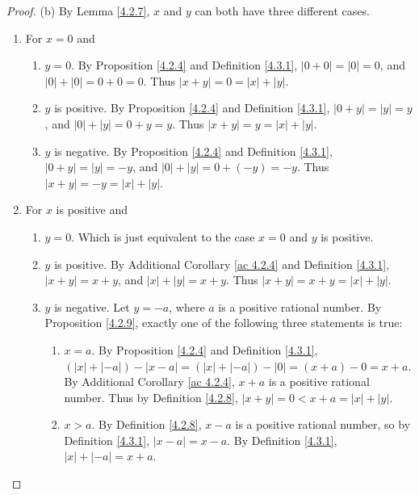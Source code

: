 \begin{proof}{(b)}
By Lemma \ref{4.2.7}, \(x\) and \(y\) can both have three different cases.
\begin{enumerate}[label=(\Roman*)]
    \item For \(x = 0\) and
    \begin{enumerate}[label=(\roman*)]
        \item \(y = 0\).
        By Proposition \ref{4.2.4} and Definition \ref{4.3.1}, \(|0 + 0| = |0| = 0\), and \(|0| + |0| = 0 + 0 = 0\).
        Thus \(|x + y| = 0 = |x| + |y|\).
        \item \(y\) is positive.
        By Proposition \ref{4.2.4} and Definition \ref{4.3.1}, \(|0 + y| = |y| = y\), and \(|0| + |y| = 0 + y = y\).
        Thus \(|x + y| = y = |x| + |y|\).
        \item \(y\) is negative.
        By Proposition \ref{4.2.4} and Definition \ref{4.3.1}, \(|0 + y| = |y| = -y\), and \(|0| + |y| = 0 + (-y) = -y\).
        Thus \(|x + y| = -y = |x| + |y|\).
    \end{enumerate}
    \item For \(x\) is positive and
    \begin{enumerate}[label=(\roman*)]
        \item \(y = 0\).
        Which is just equivalent to the case \(x = 0\) and \(y\) is positive.
        \item \(y\) is positive.
        By Additional Corollary \ref{ac 4.2.4} and Definition \ref{4.3.1}, \(|x + y| = x + y\), and \(|x| + |y| = x + y\).
        Thus \(|x + y| = x + y = |x| + |y|\).
        \item \(y\) is negative.
        Let \(y = -a\), where \(a\) is a positive rational number.
        By Proposition \ref{4.2.9}, exactly one of the following three statements is true:
        \begin{enumerate}[label=(\arabic*)]
            \item \(x = a\).
            By Proposition \ref{4.2.4} and Definition \ref{4.3.1}, \((|x| + |-a|) - |x - a| = (|x| + |-a|) - |0| = (x + a) - 0 = x + a\).
            By Additional Corollary \ref{ac 4.2.4}, \(x + a\) is a positive rational number.
            Thus by Definition \ref{4.2.8}, \(|x + y| = 0 < x + a = |x| + |y|\).
            \item \(x > a\).
            By Definition \ref{4.2.8}, \(x - a\) is a positive rational number, so by Definition \ref{4.3.1}, \(|x - a| = x - a\).
            By Definition \ref{4.3.1}, \(|x| + |-a| = x + a\).

\end{enumerate}
\end{enumerate}
\end{enumerate}
\end{proof}
